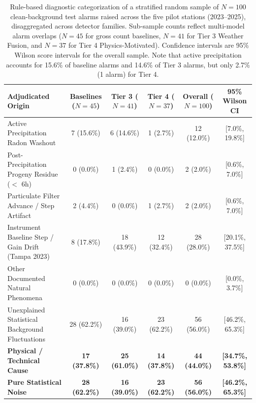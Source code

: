 \begin{table}[H]
\caption{Rule-based diagnostic categorization of a stratified random sample of $N = 100$ clean-background test alarms raised across the five pilot stations (2023--2025), disaggregated across detector families. Sub-sample counts reflect multi-model alarm overlaps ($N=45$ for gross count baselines, $N=41$ for Tier 3 Weather Fusion, and $N=37$ for Tier 4 Physics-Motivated). Confidence intervals are 95\% Wilson score intervals for the overall sample. Note that active precipitation accounts for 15.6\% of baseline alarms and 14.6\% of Tier 3 alarms, but only 2.7\% (1 alarm) for Tier 4.}
\label{tab:alarm_adjudication}
\centering
\small
\begin{tabularx}{\textwidth}{@{}X c c c c c@{}}
\toprule
\textbf{Adjudicated Origin} & \textbf{Baselines ($N=45$)} & \textbf{Tier 3 ($N=41$)} & \textbf{Tier 4 ($N=37$)} & \textbf{Overall ($N=100$)} & \textbf{95\% Wilson CI} \\
\midrule
Active Precipitation Radon Washout & 7 (15.6\%) & 6 (14.6\%) & 1 (2.7\%) & 12 (12.0\%) & [7.0\%, 19.8\%] \\
Post-Precipitation Progeny Residue ($<$ 6h) & 0 (0.0\%) & 1 (2.4\%) & 0 (0.0\%) & 2 (2.0\%) & [0.6\%, 7.0\%] \\
Particulate Filter Advance / Step Artifact & 2 (4.4\%) & 0 (0.0\%) & 1 (2.7\%) & 2 (2.0\%) & [0.6\%, 7.0\%] \\
Instrument Baseline Step / Gain Drift (Tampa 2023) & 8 (17.8\%) & 18 (43.9\%) & 12 (32.4\%) & 28 (28.0\%) & [20.1\%, 37.5\%] \\
Other Documented Natural Phenomena & 0 (0.0\%) & 0 (0.0\%) & 0 (0.0\%) & 0 (0.0\%) & [0.0\%, 3.7\%] \\
Unexplained Statistical Background Fluctuations & 28 (62.2\%) & 16 (39.0\%) & 23 (62.2\%) & 56 (56.0\%) & [46.2\%, 65.3\%] \\
\midrule
\textbf{Physical / Technical Cause} & \textbf{17 (37.8\%)} & \textbf{25 (61.0\%)} & \textbf{14 (37.8\%)} & \textbf{44 (44.0\%)} & \textbf{[34.7\%, 53.8\%]} \\
\textbf{Pure Statistical Noise} & \textbf{28 (62.2\%)} & \textbf{16 (39.0\%)} & \textbf{23 (62.2\%)} & \textbf{56 (56.0\%)} & \textbf{[46.2\%, 65.3\%]} \\
\bottomrule
\end{tabularx}
\end{table}
